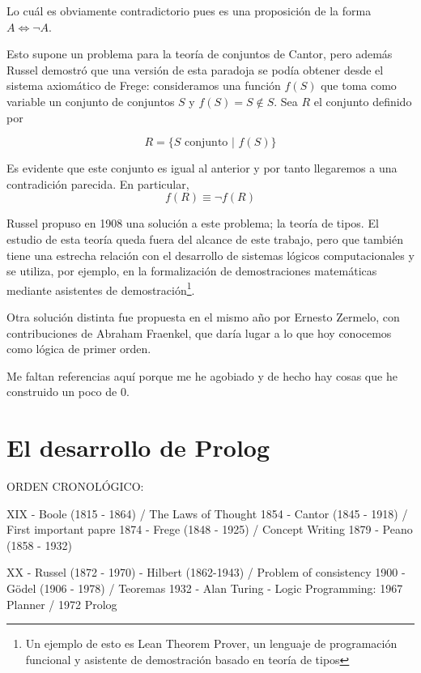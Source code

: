 \documentclass{article}
\begin{document}
Lo cuál es obviamente contradictorio pues es una proposición de la forma $A \iff \lnot A$.

Esto supone un problema para la teoría de conjuntos de Cantor, pero además Russel demostró que una versión de esta paradoja se podía obtener desde el sistema axiomático de Frege: consideramos una función $f(S)$ que toma como variable un conjunto de conjuntos $S$ y $f(S) = S \notin S$. Sea $R$ el conjunto definido por

$$
    R = \{S \,\, \text{conjunto} \,\, | \,\, f(S)\}
$$

Es evidente que este conjunto es igual al anterior y por tanto llegaremos a una contradición parecida. En particular, $$f(R) \equiv \lnot f(R)$$

Russel propuso en 1908 una solución a este problema; la teoría de tipos. El estudio de esta teoría queda fuera del alcance de este trabajo, pero que también tiene una estrecha relación con el desarrollo de sistemas lógicos computacionales y se utiliza, por ejemplo, en la formalización de demostraciones matemáticas mediante asistentes de demostración\footnote{Un ejemplo de esto es Lean Theorem Prover, un lenguaje de programación funcional y asistente de demostración basado en teoría de tipos}.

Otra solución distinta fue propuesta en el mismo año por Ernesto Zermelo, con contribuciones de Abraham Fraenkel, que daría lugar a lo que hoy conocemos como lógica de primer orden.


Me faltan referencias aquí porque me he agobiado y de hecho hay cosas que he construido un poco de 0.



\section{El desarrollo de Prolog}











ORDEN CRONOLÓGICO:

XIX 
- Boole (1815 - 1864) / The Laws of Thought 1854
- Cantor (1845 - 1918) / First important papre 1874
- Frege (1848 - 1925) / Concept Writing 1879
- Peano (1858 - 1932)



XX
- Russel (1872 - 1970)
- Hilbert (1862-1943) / Problem of consistency 1900
- Gödel (1906 - 1978) / Teoremas 1932
- Alan Turing
- Logic Programming: 1967 Planner / 1972 Prolog
\end{document}
